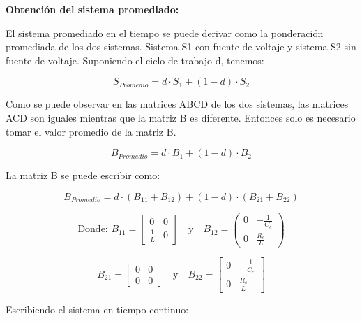 \textbf{Obtención del sistema promediado:}

El sistema promediado en el tiempo se puede derivar como la ponderación promediada de
los dos sistemas. Sistema S1 con fuente de voltaje y sistema S2
sin fuente de voltaje. Suponiendo el ciclo de trabajo d, tenemos:

\vspace{-0.5cm}
\begin{equation}
    S_{Promedio} = d \cdot S_1 + (1 - d) \cdot S_2
\end{equation}

Como se puede observar en las matrices ABCD de los dos sistemas, las matrices ACD
son iguales mientras que la matriz B es diferente.
Entonces solo es necesario tomar el valor promedio de la matriz B.

\vspace{-0.5cm}
\begin{equation}
    B_{Promedio} = d \cdot B_1 + (1 - d) \cdot B_2
\end{equation}

La matriz B se puede escribir como:

\vspace{-0.5cm}
\begin{equation}
    B_{Promedio} = d \cdot (B_11 + B_12) + (1 - d) \cdot (B_21 + B_22)
\end{equation}

\vspace{-0.5cm}
\[
\text{Donde: } B_{11} = \begin{bmatrix}
0 & 0 \\
\frac{1}{L} & 0
\end{bmatrix}
\quad \text{y} \quad
B_{12} = \begin{pmatrix}
0 & -\frac{1}{C_c} \\
0 & \frac{R_c}{L}
\end{pmatrix}
\]

\vspace{-0.5cm}
\[
B_{21} = \begin{bmatrix}
0 & 0 \\
0 & 0
\end{bmatrix}
\quad \text{y} \quad
B_{22} = \begin{bmatrix}
0 & -\frac{1}{C_c} \\
0 & \frac{R_c}{L}
\end{bmatrix}
\]

Escribiendo el sistema en tiempo continuo:


